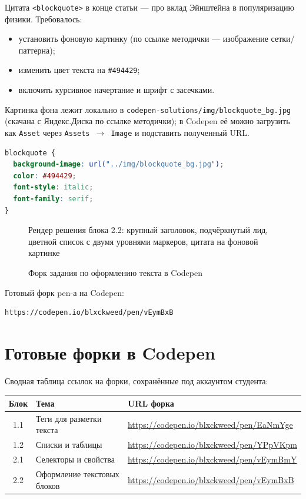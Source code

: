 Цитата \texttt{<blockquote>} в конце статьи --- про вклад
Эйнштейна в популяризацию физики. Требовалось:
\begin{itemize}
  \item установить фоновую картинку (по ссылке методички ---
        изображение сетки/паттерна);
  \item изменить цвет текста на \texttt{\#494429};
  \item включить курсивное начертание и шрифт с засечками.
\end{itemize}

Картинка фона лежит локально в \texttt{codepen-solutions/img/blockquote\_bg.jpg}
(скачана с Яндекс.Диска по ссылке методички); в Codepen её можно
загрузить как \texttt{Asset} через
\texttt{Assets~\(\rightarrow\)~Image} и подставить полученный URL.

\begin{lstlisting}[language=CSS]
blockquote {
  background-image: url("../img/blockquote_bg.jpg");
  color: #494429;
  font-style: italic;
  font-family: serif;
}
\end{lstlisting}

\begin{figure}[h]
  \centering
  \caption{Рендер решения блока 2.2: крупный заголовок, подчёркнутый лид, цветной список с двумя уровнями маркеров, цитата на фоновой картинке}
  \label{fig:block_2_2}
\end{figure}

\begin{figure}[h]
  \centering
  \caption{Форк задания по оформлению текста в Codepen}
  \label{fig:codepen_fork_22}
\end{figure}

Готовый форк pen-а на Codepen:
\begin{lstlisting}
https://codepen.io/blxckweed/pen/vEymBxB
\end{lstlisting}

\section{Готовые форки в Codepen}

Сводная таблица ссылок на форки, сохранённые под аккаунтом студента:

\begin{center}
\begin{tabular}{|c|l|l|}
\hline
\textbf{Блок} & \textbf{Тема} & \textbf{URL форка} \\
\hline
1.1 & Теги для разметки текста        & \url{https://codepen.io/blxckweed/pen/EaNmYge} \\
1.2 & Списки и таблицы                & \url{https://codepen.io/blxckweed/pen/YPpVKpm} \\
2.1 & Селекторы и свойства            & \url{https://codepen.io/blxckweed/pen/vEymBmY} \\
2.2 & Оформление текстовых блоков     & \url{https://codepen.io/blxckweed/pen/vEymBxB} \\
\hline
\end{tabular}
\end{center}

